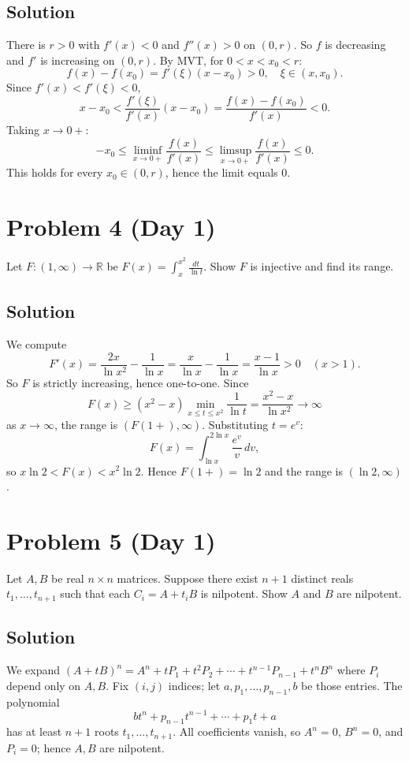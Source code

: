 \documentclass{article}
\begin{document}
\subsection*{Solution}
There is $r > 0$ with $f'(x) < 0$ and $f''(x) > 0$ on $(0, r)$. So $f$ is decreasing and $f'$ is increasing on $(0,r)$. By MVT, for $0 < x < x_0 < r$:
\[
f(x) - f(x_0) = f'(\xi)(x - x_0) > 0, \quad \xi \in (x, x_0).
\]
Since $f'(x) < f'(\xi) < 0$,
\[
x - x_0 < \frac{f'(\xi)}{f'(x)}(x - x_0) = \frac{f(x) - f(x_0)}{f'(x)} < 0.
\]
Taking $x \to 0+$:
\[
-x_0 \leq \liminf_{x\to 0+} \frac{f(x)}{f'(x)} \leq \limsup_{x\to 0+} \frac{f(x)}{f'(x)} \leq 0.
\]
This holds for every $x_0 \in (0, r)$, hence the limit equals $0$.

\section*{Problem 4 (Day 1)}
Let $F: (1, \infty) \to \mathbb{R}$ be $F(x) = \int_x^{x^2} \frac{dt}{\ln t}$. Show $F$ is injective and find its range.

\subsection*{Solution}
We compute
\[
F'(x) = \frac{2x}{\ln x^2} - \frac{1}{\ln x} = \frac{x}{\ln x} - \frac{1}{\ln x} = \frac{x-1}{\ln x} > 0 \quad (x > 1).
\]
So $F$ is strictly increasing, hence one-to-one. Since
\[
F(x) \geq (x^2 - x) \min_{x \leq t \leq x^2} \frac{1}{\ln t} = \frac{x^2 - x}{\ln x^2} \to \infty
\]
as $x \to \infty$, the range is $(F(1+), \infty)$. Substituting $t = e^v$:
\[
F(x) = \int_{\ln x}^{2\ln x} \frac{e^v}{v}\,dv,
\]
so $x \ln 2 < F(x) < x^2 \ln 2$. Hence $F(1+) = \ln 2$ and the range is $(\ln 2, \infty)$.

\section*{Problem 5 (Day 1)}
Let $A, B$ be real $n \times n$ matrices. Suppose there exist $n+1$ distinct reals $t_1, \ldots, t_{n+1}$ such that each $C_i = A + t_i B$ is nilpotent. Show $A$ and $B$ are nilpotent.

\subsection*{Solution}
We expand $(A + tB)^n = A^n + tP_1 + t^2 P_2 + \cdots + t^{n-1} P_{n-1} + t^n B^n$ where $P_i$ depend only on $A,B$. Fix $(i,j)$ indices; let $a, p_1, \ldots, p_{n-1}, b$ be those entries. The polynomial
\[
bt^n + p_{n-1}t^{n-1} + \cdots + p_1 t + a
\]
has at least $n+1$ roots $t_1, \ldots, t_{n+1}$. All coefficients vanish, so $A^n = 0$, $B^n = 0$, and $P_i = 0$; hence $A, B$ are nilpotent.
\end{document}
